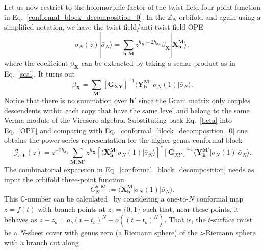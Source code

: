 \documentclass[a4paper,11pt]{article}
\begin{document}
Let us now restrict to the holomorphic factor of the twist field four-point function in Eq.~\eqref{conformal_block_decomposition_0}. In the $\mathbb Z_N$ orbifold and again using a simplified notation,  we have the twist field/anti-twist field OPE
\begin{equation}
\label{OPE}
 \sigma_N(z)|\bar{\sigma}_N\rangle=\sum_{\boldsymbol{h},\boldsymbol{M}} z^{h_{\boldsymbol{X}}-2h_{\sigma_N}}\beta_{\boldsymbol{X}}|\boldsymbol{X}_{\boldsymbol{h}}^{\boldsymbol{M}}\rangle,
\end{equation}
where the coefficient $\beta_{\boldsymbol{X}}$ can be extracted by taking a scalar product as in Eq.~\eqref{scal}. It turns out
\begin{equation}
\label{beta}
 \beta_{\boldsymbol{X}}=\sum_{\boldsymbol{M}'} [\boldsymbol{G_{\boldsymbol{X}\boldsymbol{Y}}}]^{-1}\langle \boldsymbol{Y}_{\boldsymbol{h}}^{\boldsymbol{M}'}|\sigma_N(1)|\bar{\sigma}_N\rangle.
\end{equation}
Notice that there is no summation over $\boldsymbol{h}'$ since the Gram matrix only couples descendents within each copy that have the same level and belong to the same Verma module of the Virasoro algebra.
Substituting back Eq.~\eqref{beta} into Eq.~\eqref{OPE} and comparing with Eq.~\eqref{conformal_block_decomposition_0} 
one obtains the power series representation for the higher genus conformal block 
\begin{equation}\label{conformal_block_decomposition}
 \mathcal{G}_{c,\boldsymbol{h}}(z)=
 z^{-2h_{\sigma_N}}\sum_{\boldsymbol{M}, \boldsymbol{M}'} z^{h_{\boldsymbol{X}}}[\langle \boldsymbol{X}_{\boldsymbol{h}}^{\boldsymbol{M}}|\sigma_N(1)|\bar{\sigma}_N\rangle]^*[\boldsymbol{G}_{XY}]^{-1}\langle \boldsymbol{Y}_{\boldsymbol{h}}^{\boldsymbol{M}'}| \sigma_N(1)|\bar{\sigma}_N\rangle.
\end{equation}
The combinatorial expansion  in Eq.~\eqref{conformal_block_decomposition} needs as input the orbifold three-point function
\begin{equation}\label{orbifold_three-point}
 C_N^{\boldsymbol{h},\boldsymbol{M}}:=\langle \boldsymbol{X}_{\boldsymbol{h}}^{\boldsymbol{M}}| \sigma_N(1)|\bar{\sigma}_N\rangle.
\end{equation}
This $\mathbb C$-number can be calculated~\cite{Lunin} by considering a one-to-$N$ conformal map
$z=f(t)$ with branch points at $z_b=\{0, 1\}$ such that, near 
these points, it behaves as $z-z_b=a_b(t-t_b)^N+o((t-t_b)^N)$.
That is, the $t$-surface must be a $N$-sheet cover with genus zero (a Riemann sphere)
 of the $z$-Riemann sphere with a branch cut along 
\end{document}
